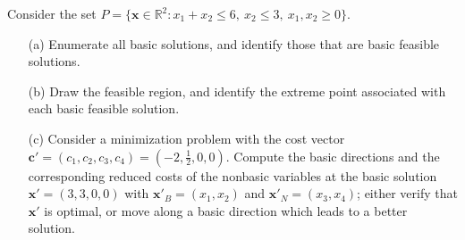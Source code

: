 
Consider the set $P=\{\mathbf{x}\in\mathbb{R}^2 : x_1 + x_2 \leq 6,~ x_2 \leq 3,~ x_1, x_2 \geq0\}$. 

\begin{itemize}
\item[(a)] Enumerate all basic solutions, and identify those that are basic feasible solutions.
\item[(b)] Draw the feasible region, and identify the extreme point associated with each basic feasible solution.
\item[(c)] Consider a minimization problem with the cost vector $\mathbf{c'}=(c_1,c_2,c_3,c_4)=(-2,\frac{1}{2},0,0)$. Compute the basic directions and the corresponding reduced costs of the nonbasic variables at the basic solution $\mathbf{x'}=(3,3,0,0)$ with $\mathbf{x}'_B=(x_1,x_2)$ and $\mathbf{x}'_N=(x_3,x_4)$; either verify that $\mathbf{x'}$ is optimal, or move along a basic direction which leads to a better solution. 
\end{itemize}